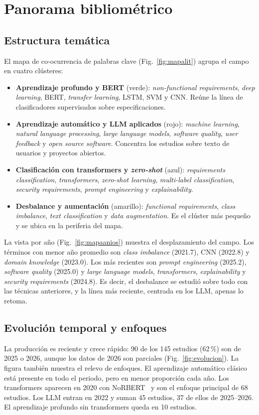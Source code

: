 \documentclass[conference]{IEEEtran}
\begin{document}
\section{Panorama bibliométrico}\label{sec:panorama}
\subsection{Estructura temática}
El mapa de co-ocurrencia de palabras clave (Fig.~\ref{fig:mapalit}) agrupa el campo en cuatro clústeres:
\begin{itemize}
  \item \textbf{Aprendizaje profundo y BERT} (verde): \emph{non-functional requirements}, \emph{deep learning}, BERT, \emph{transfer learning}, LSTM, SVM y CNN. Reúne la línea de clasificadores supervisados sobre especificaciones.
  \item \textbf{Aprendizaje automático y LLM aplicados} (rojo): \emph{machine learning}, \emph{natural language processing}, \emph{large language models}, \emph{software quality}, \emph{user feedback} y \emph{open source software}. Concentra los estudios sobre texto de usuarios y proyectos abiertos.
  \item \textbf{Clasificación con transformers y \emph{zero-shot}} (azul): \emph{requirements classification}, \emph{transformers}, \emph{zero-shot learning}, \emph{multi-label classification}, \emph{security requirements}, \emph{prompt engineering} y \emph{explainability}.
  \item \textbf{Desbalance y aumentación} (amarillo): \emph{functional requirements}, \emph{class imbalance}, \emph{text classification} y \emph{data augmentation}. Es el clúster más pequeño y se ubica en la periferia del mapa.
\end{itemize}
La vista por año (Fig.~\ref{fig:mapaanios}) muestra el desplazamiento del campo. Los términos con menor año promedio son \emph{class imbalance} (2021.7), CNN (2022.8) y \emph{domain knowledge} (2023.0). Los más recientes son \emph{prompt engineering} (2025.2), \emph{software quality} (2025.0) y \emph{large language models}, \emph{transformers}, \emph{explainability} y \emph{security requirements} (2024.8). Es decir, el desbalance se estudió sobre todo con las técnicas anteriores, y la línea más reciente, centrada en los LLM, apenas lo retoma.

\subsection{Evolución temporal y enfoques}
La producción es reciente y crece rápido: 90 de los 145 estudios (62\,\%) son de 2025 o 2026, aunque los datos de 2026 son parciales (Fig.~\ref{fig:evolucion}). La figura también muestra el relevo de enfoques. El aprendizaje automático clásico está presente en todo el periodo, pero en menor proporción cada año. Los transformers aparecen en 2020 con NoRBERT~\cite{Hey2020-NoRBERT} y son el enfoque principal de 68 estudios. Los LLM entran en 2022 y suman 45 estudios, 37 de ellos de 2025--2026. El aprendizaje profundo sin transformers queda en 10 estudios.
\end{document}
